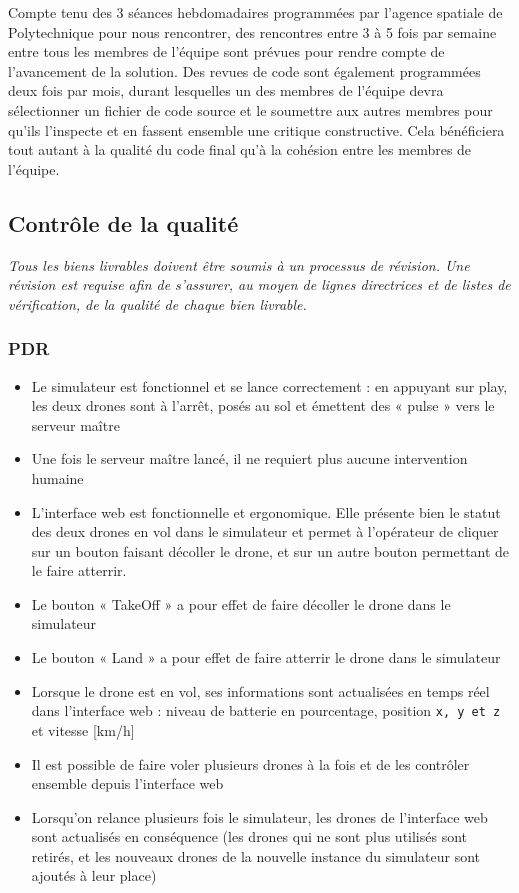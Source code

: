 \documentclass{mistcoursedoc}
\begin{document}
Compte tenu des 3 séances hebdomadaires programmées par l'agence spatiale de Polytechnique pour nous rencontrer, des rencontres entre 3 à 5 fois par semaine entre tous les membres de l'équipe sont prévues pour rendre compte de l'avancement de la solution. Des revues de code sont également programmées deux fois par mois, durant lesquelles un des membres de l'équipe devra sélectionner un fichier de code source et le soumettre aux autres membres pour qu'ils l'inspecte et en fassent ensemble une critique constructive. Cela bénéficiera tout autant à la qualité du code final qu'à la cohésion entre les membres de l'équipe.

\subsection{Contrôle de la qualité}

\textit{Tous les biens livrables doivent être soumis à un processus de révision. Une révision est requise afin de s’assurer, au moyen de lignes directrices et de listes de vérification, de la qualité de chaque bien livrable.}
\subsubsection{PDR}
  \begin{itemize}
    \item Le simulateur est fonctionnel et se lance correctement : en appuyant sur play, les deux drones sont à l'arrêt, posés au sol et émettent des « pulse » vers le serveur maître
    \item Une fois le serveur maître lancé, il ne requiert plus aucune intervention humaine
    \item L'interface web est fonctionnelle et ergonomique. Elle présente bien le statut des deux drones en vol dans le simulateur et permet à l'opérateur de cliquer sur un bouton faisant décoller le drone, et sur un autre bouton permettant de le faire atterrir.
    \item Le bouton « TakeOff » a pour effet de faire décoller le drone dans le simulateur
    \item Le bouton « Land » a pour effet de faire atterrir le drone dans le simulateur
    \item Lorsque le drone est en vol, ses informations sont actualisées en temps réel dans l'interface web : niveau de batterie en pourcentage, position \texttt{x, y et z} et vitesse [km/h]
    \item Il est possible de faire voler plusieurs drones à la fois et de les contrôler ensemble depuis l'interface web
    \item Lorsqu'on relance plusieurs fois le simulateur, les drones de l'interface web sont actualisés en conséquence (les drones qui ne sont plus utilisés sont retirés, et les nouveaux drones de la nouvelle instance du simulateur sont ajoutés à leur place)
  \end{itemize}
\end{document}
